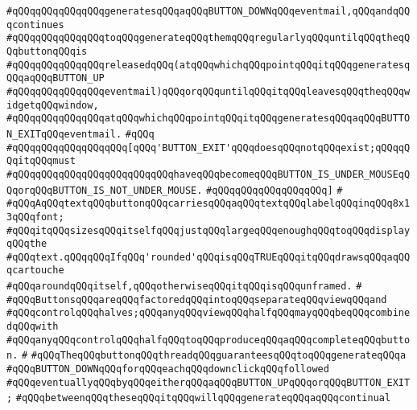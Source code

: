 \verb|#qQQqqQQqqQQqqQQqgeneratesqQQqaqQQqBUTTON_DOWNqQQqeventmail,qQQqandqQQqcontinues|\newline
\verb|#qQQqqQQqqQQqqQQqtoqQQqgenerateqQQqthemqQQqregularlyqQQquntilqQQqtheqQQqbuttonqQQqis|\newline
\verb|#qQQqqQQqqQQqqQQqreleasedqQQq(atqQQqwhichqQQqpointqQQqitqQQqgeneratesqQQqaqQQqBUTTON_UP|\newline
\verb|#qQQqqQQqqQQqqQQqeventmail)qQQqorqQQquntilqQQqitqQQqleavesqQQqtheqQQqwidgetqQQqwindow,|\newline
\verb|#qQQqqQQqqQQqqQQqatqQQqwhichqQQqpointqQQqitqQQqgeneratesqQQqaqQQqBUTTON_EXITqQQqeventmail.|\newline
\verb|#qQQq|\newline
\verb|#qQQqqQQqqQQqqQQqqQQq[qQQq'BUTTON_EXIT'qQQqdoesqQQqnotqQQqexist;qQQqqQQqitqQQqmust|\newline
\verb|#qQQqqQQqqQQqqQQqqQQqqQQqqQQqhaveqQQqbecomeqQQqBUTTON_IS_UNDER_MOUSEqQQqorqQQqBUTTON_IS_NOT_UNDER_MOUSE.|\newline
\verb|#qQQqqQQqqQQqqQQqqQQq]|\newline
\verb|#|\newline
\verb|#qQQqAqQQqtextqQQqbuttonqQQqcarriesqQQqaqQQqtextqQQqlabelqQQqinqQQq8x13qQQqfont;|\newline
\verb|#qQQqitqQQqsizesqQQqitselfqQQqjustqQQqlargeqQQqenoughqQQqtoqQQqdisplayqQQqthe|\newline
\verb|#qQQqtext.qQQqqQQqIfqQQq'rounded'qQQqisqQQqTRUEqQQqitqQQqdrawsqQQqaqQQqcartouche|\newline
\verb|#qQQqaroundqQQqitself,qQQqotherwiseqQQqitqQQqisqQQqunframed.|\newline
\verb|#|\newline
\verb|#qQQqButtonsqQQqareqQQqfactoredqQQqintoqQQqseparateqQQqviewqQQqand|\newline
\verb|#qQQqcontrolqQQqhalves;qQQqanyqQQqviewqQQqhalfqQQqmayqQQqbeqQQqcombinedqQQqwith|\newline
\verb|#qQQqanyqQQqcontrolqQQqhalfqQQqtoqQQqproduceqQQqaqQQqcompleteqQQqbutton.|\newline
\verb|#|\newline
\verb|#qQQqTheqQQqbuttonqQQqthreadqQQqguaranteesqQQqtoqQQqgenerateqQQqa|\newline
\verb|#qQQqBUTTON_DOWNqQQqforqQQqeachqQQqdownclickqQQqfollowed|\newline
\verb|#qQQqeventuallyqQQqbyqQQqeitherqQQqaqQQqBUTTON_UPqQQqorqQQqBUTTON_EXIT;|\newline
\verb|#qQQqbetweenqQQqtheseqQQqitqQQqwillqQQqgenerateqQQqaqQQqcontinual|\newline
